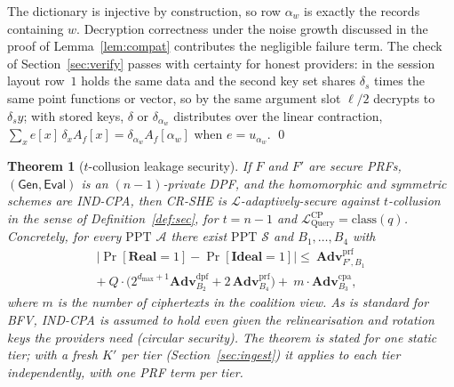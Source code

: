 \documentclass[a4paper,fleqn]{cas-sc}
\newtheorem{theorem}{Theorem}
\newcommand{\PPT}{\mathrm{PPT}}
\newcommand{\Real}{\mathbf{Real}}
\newcommand{\Ideal}{\mathbf{Ideal}}
\newcommand{\Leak}{\mathcal{L}}
\newcommand{\Sim}{\mathcal{S}}
\newcommand{\Adv}{\mathcal{A}}
\newcommand{\Gen}{\mathsf{Gen}}
\newcommand{\Eval}{\mathsf{Eval}}
\newcommand{\advPRF}{\mathbf{Adv}^{\mathrm{prf}}}
\newcommand{\advDPF}{\mathbf{Adv}^{\mathrm{dpf}}}
\newcommand{\advCPA}{\mathbf{Adv}^{\mathrm{cpa}}}
\begin{document}
\begin{pf}
The dictionary is injective by construction, so row $\alpha_w$ is exactly the
records containing $w$. Decryption correctness under the noise growth
discussed in the proof of Lemma~\ref{lem:compat} contributes the negligible
failure term. The check of Section~\ref{sec:verify} passes with certainty for
honest providers: in the session layout row~$1$ holds the same data and the
second key set shares $\delta_s$ times the same point functions or vector, so
by the same argument slot $\ell/2$ decrypts to $\delta_sy$; with stored keys,
$\delta$ or $\delta_{\alpha_w}$ distributes over the linear contraction,
$\sum_x e[x]\,\delta_xA_f[x]=\delta_{\alpha_w}A_f[\alpha_w]$ when
$e=u_{\alpha_w}$. \qed
\end{pf}

\begin{theorem}[$t$-collusion leakage security]
\label{thm:sec}
If $F$ and $F'$ are secure PRFs, $(\Gen,\Eval)$ is an $(n{-}1)$-private DPF, and the
homomorphic and symmetric schemes are IND-CPA, then CR-SHE is
$\Leak$-adaptively-secure against $t$-collusion in the sense of
Definition~\ref{def:sec}, for $t=n-1$ and
$\Leak^{\text{CP}}_{\mathrm{Query}}=\mathrm{class}(q)$. Concretely, for every
$\PPT$ $\Adv$ there exist $\PPT$ $\Sim$ and $B_1,\dots,B_4$ with
\begin{multline*}
\big|\Pr[\Real{=}1]-\Pr[\Ideal{=}1]\big|
\le\ \advPRF_{F',B_1}\\
+\ Q\cdot\big(2^{d_{\max}+1}\advDPF_{B_2}
+2\,\advPRF_{B_4}\big)
+\ m\cdot\advCPA_{B_3},
\end{multline*}
where $m$ is the number of ciphertexts in the coalition view. As is standard
for BFV, IND-CPA is assumed to hold even given the relinearisation and
rotation keys the providers need (circular security). The theorem is stated
for one static tier; with a fresh $K'$ per tier
(Section~\ref{sec:ingest}) it applies to each tier independently, with one PRF
term per tier.
\end{theorem}
\end{document}
